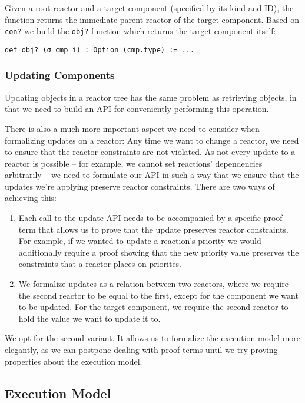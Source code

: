 Given a root reactor and a target component (specified by its kind and ID), the function returns the immediate parent reactor of the target component.
Based on \lstinline{con?} we build the \lstinline{obj?} function which returns the target component itself:

\begin{lstlisting}
def obj? (σ cmp i) : Option (cmp.type) := ...
\end{lstlisting}

\subsubsection{Updating Components}
\label{sec:updating-cmps}

Updating objects in a reactor tree has the same problem as retrieving objects, in that we need to build an API for conveniently performing this operation.

There is also a much more important aspect we need to consider when formalizing updates on a reactor:
Any time we want to change a reactor, we need to ensure that the reactor constraints are not violated.
As not every update to a reactor is possible -- for example, we cannot set reactions' dependencies arbitrarily -- we need to formulate our API in such a way that we ensure that the updates we're applying preserve reactor constraints.
There are two ways of achieving this:

\begin{enumerate}
  \item Each call to the update-API needs to be accompanied by a specific proof term that allows us to prove that the update preserves reactor constraints.
        For example, if we wanted to update a reaction's priority we would additionally require a proof showing that the new priority value preserves the constraints that a reactor places on priorites.
  \item We formalize updates as a relation between two reactors, where we require the second reactor to be equal to the first, except for the component we want to be updated. 
        For the target component, we require the second reactor to hold the value we want to update it to.
\end{enumerate}

We opt for the second variant.
It allows us to formalize the execution model more elegantly, as we can postpone dealing with proof terms until we try proving properties about the execution model.

\subsection{Execution Model}

